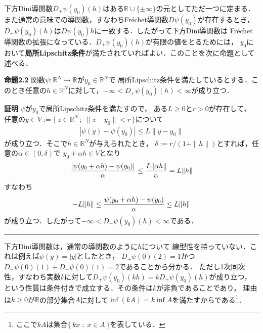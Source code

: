 \documentclass[a4paper,11pt]{jsarticle}
\DeclareRobustCommand{\lfrac}[2]{{\lower.4ex\hbox{\begingroup\ensuremath{#1}\endgroup}\over{\hspace{.2mm}#2\hspace{.2mm}}}}
\begin{document}
下方Dini導関数$D_{+}\psi(y_0)(h)$はある$\mathbb{R}\cup\{\pm \infty\}$の元としてただ一つに定まる．
また通常の意味での導関数，すなわちFr\'{e}chet導関数$D\psi(y_0)$が存在するとき，
$D_{+}\psi(y_0)(h)$は$D\psi(y_0)h$に一致する．したがって下方Dini導関数は
Fr\'{e}chet導関数の拡張になっている．$D_{+}\psi(y_0)(h)$が有限の値をとるためには，
$y_0$において\textbf{局所Lipschitz条件}が満たされていればよい．このことを次に命題として述べる．

\vspace{7mm}
\noindent \textbf{命題2.2}\hspace*{.7mm} 関数$\psi:\mathbb{R}^N \to \mathbb{R}$が$y_0\in \mathbb{R}^N$で
局所Lipschitz条件を満たしているとする．このとき任意の$h \in \mathbb{R}^N$に対して，$-\infty<D_+\psi(y_0)(h)<\infty$が成り立つ．
\bigskip

\noindent \textbf{証明}\hspace{.7mm} $\psi$が$y_0$で局所Lipschitz条件を満たすので，
ある$L\geq 0$と$r>0$が存在して，
任意の$y \in V:=\{\,z \in \mathbb{R}^N\,;\;\|z-y_0\|<r \,\}$について
\begin{align*}
	|\psi(y)-\psi(y_0)|\leq L \|y-y_0\|
\end{align*}
が成り立つ．そこで$h \in \mathbb{R}^N$が与えられたとき，
$\delta:=r/(1+\|h\|)$とすれば，任意の$\alpha \in (0,\delta)$で
$y_0+\alpha h \in V$となり
\begin{align*}
	\lfrac{|\psi(y_0+\alpha h)-\psi(y_0)|}{\alpha} \leq \lfrac{L\|\alpha h\|}{\alpha}=L\|h\|
\end{align*}
すなわち
\begin{align*}
	-L\|h\| \leq \lfrac{\psi(y_0+\alpha h)-\psi(y_0)}{\alpha} \leq L\|h\|
\end{align*}
が成り立つ．したがって$-\infty <D_{+}\psi(y_0)(h)< \infty$である．\hfill \rule[-2pt]{5pt}{10pt}

\vspace{7mm}

下方Dini導関数は，通常の導関数のように$h$について
線型性を持っていない．これは例えば$\psi(y)=|y|$としたとき，
$D_+\psi(0)(2)=1$かつ$D_+\psi (0)(1)+D_+\psi (0)(1)=2$であることから分かる．
ただし1次同次性，すなわち実数$k$に対して$D_{+}\psi(y_0)(k h)=k D_{+}\psi(y_0)(h)$が成り立つ，
という性質は条件付きで成立する．その条件は$k$が非負であることであり，
理由は$k\geq 0$が$\mathbb{R}$の部分集合$A$に対して$\inf (kA)=k \inf A$を満たすからである\footnote{ここで$kA$は集合$\{\,kx \;;\; x \in A\,\}$を表している．}．
\end{document}
